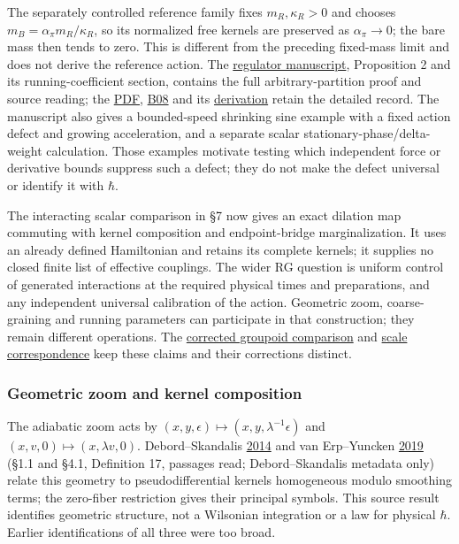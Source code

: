 \documentclass[11pt,a4paper]{article}
\begin{document}
The separately controlled reference family fixes \(m_R,\kappa_R>0\) and
chooses \(m_B=\alpha_\pi m_R/\kappa_R\), so its normalized free kernels
are preserved as \(\alpha_\pi\to0\); the bare mass then tends to zero.
This is different from the preceding fixed-mass limit and does not
derive the reference action. The
\href{../papers/regulator-limits.tex}{regulator manuscript}, Proposition
2 and its running-coefficient section, contains the full
arbitrary-partition proof and source reading; the
\href{../out/papers/regulator-limits.pdf}{PDF},
\href{../references/batches/B08.md}{B08} and its
\href{../papers/regulator-limits.tex}{derivation} retain the detailed
record. The manuscript also gives a bounded-speed shrinking sine example
with a fixed action defect and growing acceleration, and a separate
scalar stationary-phase/delta-weight calculation. Those examples
motivate testing which independent force or derivative bounds suppress
such a defect; they do not make the defect universal or identify it with
\(\hbar\).

The interacting scalar comparison in §7 now gives an exact dilation map
commuting with kernel composition and endpoint-bridge marginalization.
It uses an already defined Hamiltonian and retains its complete kernels;
it supplies no closed finite list of effective couplings. The wider RG
question is uniform control of generated interactions at the required
physical times and preparations, and any independent universal
calibration of the action. Geometric zoom, coarse-graining and running
parameters can participate in that construction; they remain different
operations. The
\href{groupoid-quantum-newton-states.md\#geometric-zoom-and-kernel-composition}{corrected
groupoid comparison} and
\href{../research/refinement-correspondences.md}{scale correspondence}
keep these claims and their corrections distinct.

\subsubsection{Geometric zoom and kernel
composition}\label{geometric-zoom-and-kernel-composition}

The adiabatic zoom acts by
\((x,y,\epsilon)\mapsto(x,y,\lambda^{-1}\epsilon)\) and
\((x,v,0)\mapsto(x,\lambda v,0)\). Debord--Skandalis
\href{https://doi.org/10.1016/j.aim.2014.02.012}{2014} and van
Erp--Yuncken \href{https://arxiv.org/pdf/1511.01041}{2019} (§1.1 and
§4.1, Definition 17, passages read; Debord--Skandalis metadata only)
relate this geometry to pseudodifferential kernels homogeneous modulo
smoothing terms; the zero-fiber restriction gives their principal
symbols. This source result identifies geometric structure, not a
Wilsonian integration or a law for physical \(\hbar\). Earlier
identifications of all three were too broad.
\end{document}
